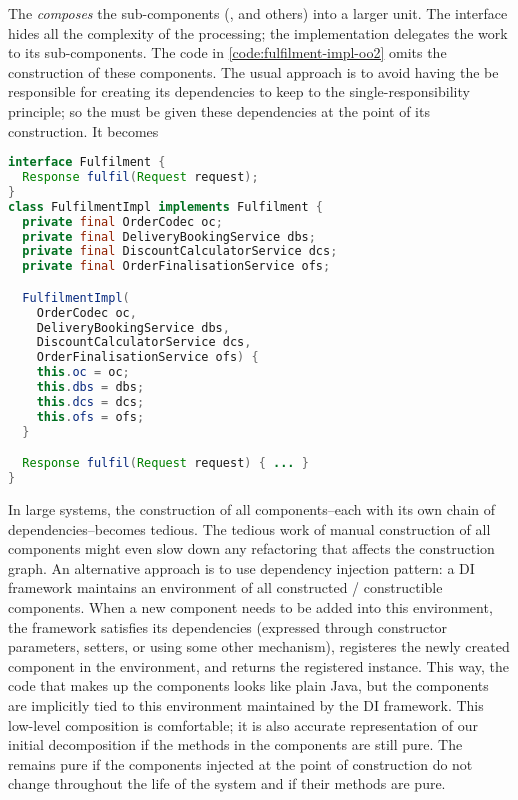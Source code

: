 \documentclass[10 pt, twocolumn]{article}
\begin{document}
The  \emph{composes} the sub-components (,  and others) into a larger unit. The interface  hides all the complexity of the processing; the implementation  delegates the work to its sub-components. The code in \autoref{code:fulfilment-impl-oo2} omits the construction of these components. The usual approach is to avoid having the  be responsible for creating its dependencies to keep to the single-responsibility principle; so the  must be given these dependencies at the point of its construction. It becomes 

\begin{lstlisting}[caption={Fulfilment OO implementation II}, label={code:fulfilment-impl-oo3}, language=Java, escapechar=|]
interface Fulfilment {
  Response fulfil(Request request);
}
class FulfilmentImpl implements Fulfilment {
  private final OrderCodec oc;
  private final DeliveryBookingService dbs;
  private final DiscountCalculatorService dcs;
  private final OrderFinalisationService ofs;

  FulfilmentImpl(
    OrderCodec oc, 
    DeliveryBookingService dbs,
    DiscountCalculatorService dcs,
    OrderFinalisationService ofs) {
    this.oc = oc;
    this.dbs = dbs;
    this.dcs = dcs;
    this.ofs = ofs;
  }

  Response fulfil(Request request) { ... }
}
\end{lstlisting}

In large systems, the construction of all components--each with its own chain of dependencies--becomes tedious. The tedious work of manual construction of all components might even slow down any refactoring that affects the construction graph. An alternative approach is to use dependency injection pattern: a DI framework maintains an environment of all constructed / constructible components. When a new component needs to be added into this environment, the framework satisfies its dependencies (expressed through constructor parameters, setters, or using some other mechanism), registeres the newly created component in the environment, and returns the registered instance. This way, the code that makes up the components looks like plain Java, but the components are implicitly tied to this environment maintained by the DI framework. This low-level composition is comfortable; it is also accurate representation of our initial decomposition if the methods in the components are still pure. The  remains pure if the components injected at the point of construction do not change throughout the life of the system and if their methods are pure. 
\end{document}

